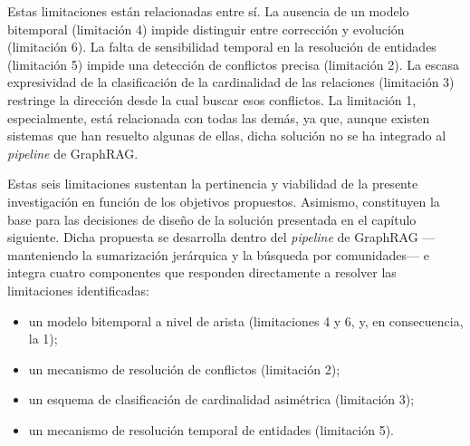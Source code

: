 Estas limitaciones están relacionadas entre sí. La ausencia de un modelo bitemporal (limitación 4) impide distinguir entre corrección y evolución (limitación 6). La falta de sensibilidad temporal en la resolución de entidades (limitación 5) impide una detección de conflictos precisa (limitación 2). La escasa expresividad de la clasificación de la cardinalidad de las relaciones (limitación 3) restringe la dirección desde la cual buscar esos conflictos. La limitación 1, especialmente, está relacionada con todas las demás, ya que, aunque existen sistemas que han resuelto algunas de ellas, dicha solución no se ha integrado al \emph{pipeline} de GraphRAG.

Estas seis limitaciones sustentan la pertinencia y viabilidad de la presente investigación en función de los objetivos propuestos. Asimismo, constituyen la base para las decisiones de diseño de la solución presentada en el capítulo siguiente. Dicha propuesta se desarrolla dentro del \emph{pipeline} de GraphRAG ---manteniendo la sumarización jerárquica y la búsqueda por comunidades--- e integra cuatro componentes que responden directamente a resolver las limitaciones identificadas:
\begin{itemize}
    \item[(a)] un modelo bitemporal a nivel de arista (limitaciones 4 y 6, y, en consecuencia, la 1);
    \item[(b)] un mecanismo de resolución de conflictos (limitación 2);
    \item[(c)] un esquema de clasificación de cardinalidad asimétrica (limitación 3);
    \item[(d)] un mecanismo de resolución temporal de entidades (limitación 5).
\end{itemize}
